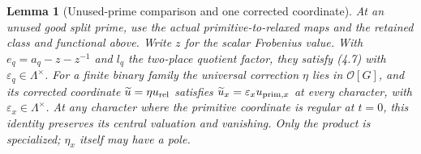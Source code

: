 \documentclass[11pt]{article}
\newtheorem{lemma}[theorem]{Lemma}
\theoremstyle{definition}
\theoremstyle{remark}
\providecommand{\mathscr}[1]{\mathcal{#1}}
\begin{document}
\begin{lemma}[Unused-prime comparison and one corrected coordinate]\label{ex:arith-common-coordinate}
At an unused good split prime, use the actual primitive-to-relaxed
maps and the retained class and functional above. Write $z$ for
the scalar Frobenius value. With $e_q=a_q-z-z^{-1}$ and $l_q$
the two-place quotient factor,
they satisfy (4.7) with $\varepsilon_q\in\Lambda^\times$.
For a finite binary family the universal correction $\eta$
lies in $\mathscr O[G]$, and its corrected coordinate
$\widetilde u=\eta u_{\rm rel}$ satisfies
$\widetilde u_x=\varepsilon_xu_{{\rm prim},x}$ at every character,
with $\varepsilon_x\in\Lambda^\times$.
At any character where the primitive coordinate is regular at
$t=0$, this identity preserves its central valuation and vanishing.
Only the product is specialized; $\eta_x$ itself may have a pole.
\end{lemma}
\end{document}
